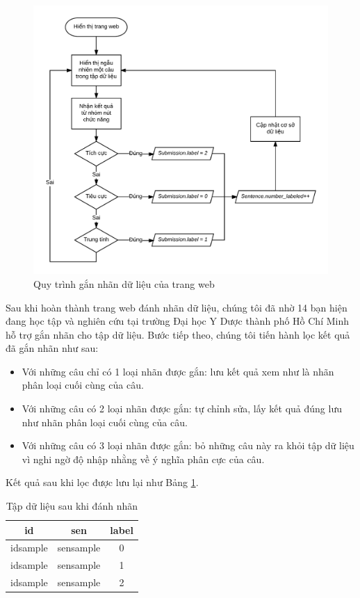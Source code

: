 \begin{figure}[h]
\centering
\includegraphics[scale=0.27]{../hinh/UpdateDatabase.png}
\caption{Quy trình gắn nhãn dữ liệu của trang web}
\label{fig:updatedb}
\end{figure}

Sau khi hoàn thành trang web đánh nhãn dữ liệu, chúng tôi đã nhờ 14 bạn hiện đang học tập và nghiên cứu tại trường Đại học Y Dược thành phố Hồ Chí Minh hỗ trợ gắn nhãn cho tập dữ liệu. Bước tiếp theo, chúng tôi tiến hành lọc kết quả đã gắn nhãn như sau:

\begin{itemize}
\item Với những câu chỉ có 1 loại nhãn được gắn: lưu kết quả xem như là nhãn phân loại cuối cùng của câu.
\item Với những câu có 2 loại nhãn được gắn: tự chỉnh sửa, lấy kết quả đúng lưu như nhãn phân loại cuối cùng của câu.
\item Với những câu có 3 loại nhãn được gắn: bỏ những câu này ra khỏi tập dữ liệu vì nghi ngờ độ nhập nhằng về ý nghĩa phân cực của câu.
\end{itemize}

Kết quả sau khi lọc được lưu lại như Bảng \ref{table:labeleddata}.

\begin{table}[H]
\centering
\begin{minipage}{1.0\textwidth}
\caption{Tập dữ liệu sau khi đánh nhãn} 
\label{table:labeleddata}
\begin{tabular}{ |c|c|c| } 
 \hline
 id & sen & label \\ 
 \hline
 idsample & sensample & 0 \\ 
 idsample & sensample & 1 \\ 
 idsample & sensample & 2 \\ 
 \hline
\end{tabular}
\end{minipage}
\end{table}

